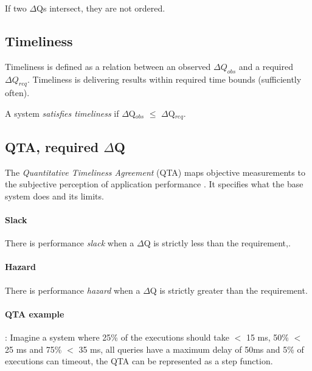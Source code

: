         If two $\Delta$Qs intersect, they are not ordered. \cite{dq-tut}

    \subsection{Timeliness}
        Timeliness is defined as a relation between an observed $\Delta Q_{obs}$ and a required $\Delta Q_{req}$. Timeliness is delivering results within required time bounds (sufficiently often). 

        A system \textit{satisfies timeliness} if $\Delta$Q$_{obs}$ $\le$ $\Delta$Q$_{req}$. \cite{art}
     
    \subsection{QTA, required $\Delta$Q}
         The \textit{Quantitative Timeliness Agreement} (QTA) maps objective measurements to the subjective perception of application performance \cite{dq-br}. It specifies what the base system does and its limits.
    
    \paragraph{Slack} There is performance \textit{slack} when a $\Delta$Q is strictly less than the requirement,.

        \paragraph{Hazard} There is performance \textit{hazard} when a $\Delta$Q is strictly greater than the requirement.
    
    \paragraph{QTA example}: Imagine a system where 25\% of the executions should take $<$ 15 ms, 50\% $<$ 25 ms and 75\% $<$ 35 ms, all queries have a maximum delay of 50ms and 5\% of executions can timeout, the QTA can be represented as a step function.
    
